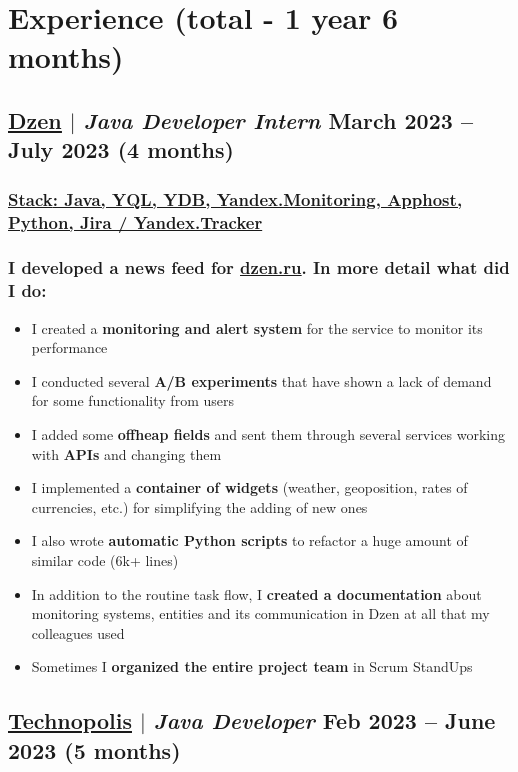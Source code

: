 \documentclass[11pt]{article}
\begin{document}
\section{Experience (total - 1 year 6 months)}
\subsection{\href{https://dzen.ru}{\underline{Dzen}} $|$ {\normalfont\textit{Java Developer Intern}} \hfill March 2023 -- July 2023 (4 months)}
\subsubsection{\underline{\textbf{Stack}: Java, YQL, YDB, Yandex.Monitoring, \href{https://habr.com/ru/companies/yandex/articles/520134/}{Apphost}, Python, Jira / Yandex.Tracker}}
\subsubsection{I developed a news feed for \href{https://dzen.ru}{\underline{dzen.ru}}. In more detail what did I do:}
\begin{itemize}
    \item I created a \textbf{monitoring and alert system} for the service to monitor its performance
    \item I conducted several \textbf{A/B experiments} that have shown a lack of demand for some functionality from users
    \item I added some \textbf{offheap fields} and sent them through several services working with \textbf{APIs} and changing them 
    \item I implemented a \textbf{container of widgets} (weather, geoposition, rates of currencies, etc.) for simplifying the adding of new ones
    \item I also wrote \textbf{automatic Python scripts} to refactor a huge amount of similar code (6k+ lines)
    \item In addition to the routine task flow, I \textbf{created a documentation} about monitoring systems, entities and its communication in Dzen at all that my colleagues used
    \item Sometimes I \textbf{organized the entire project team} in Scrum StandUps
\end{itemize}

\subsection{\href{https://polis.vk.company/}{\underline{Technopolis}} $|$ {\normalfont\textit{Java Developer}} \hfill Feb 2023 -- June 2023 (5 months)}
\end{document}
